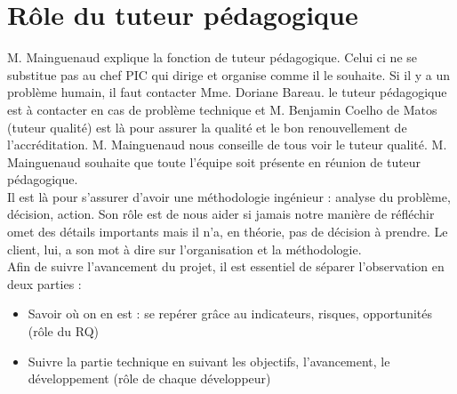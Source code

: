 \documentclass [a4paper] {article}
\begin{document}
\section{Rôle du tuteur pédagogique}
M. Mainguenaud explique la fonction de tuteur pédagogique.
Celui ci ne se substitue pas au chef PIC qui dirige et organise comme il le souhaite.
Si il y a un problème humain, il faut contacter Mme. Doriane Bareau. le tuteur pédagogique est à contacter en cas de problème technique et M. Benjamin Coelho de Matos (tuteur qualité) est là pour assurer la qualité et le bon renouvellement de l’accréditation. M. Mainguenaud nous conseille de tous voir le tuteur qualité.
M. Mainguenaud souhaite que toute l'équipe soit présente en réunion de tuteur pédagogique.
\\
Il est là pour s'assurer d'avoir une méthodologie ingénieur : analyse du problème, décision, action. Son rôle est de nous aider si jamais notre manière de réfléchir omet des détails importants mais il n'a, en théorie, pas de décision à prendre.
Le client, lui, a son mot à dire sur l'organisation et la méthodologie.
\\
Afin de suivre l'avancement du projet, il est essentiel de séparer l'observation en deux parties :
\begin{itemize}
\item Savoir où on en est : se repérer grâce au indicateurs, risques, opportunités (rôle du RQ)
\item Suivre la partie technique en suivant les objectifs, l'avancement, le développement (rôle de chaque développeur)
\end{itemize}
\end{document}
